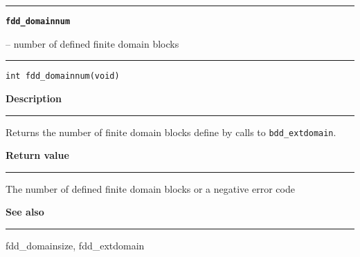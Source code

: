 \begin{minipage}{\textwidth}

\noindent\begin{minipage}{\textwidth}
\rule{\textwidth}{0.5mm}
{\tt\bf fdd\_domainnum }
\--- number of defined finite domain blocks  \hspace{\fill}
\\\rule[1.5ex]{\textwidth}{0.5mm}
\end{minipage}

\noindent\begin{verbatim}
int fdd_domainnum(void) 
\end{verbatim}

\vspace{\parsep}\noindent
{\bf Description}\\\rule[1.5ex]{\textwidth}{0.2mm}\vspace{-1.5ex}\setlength{\parindent}{1em}
Returns the number of finite domain blocks define by calls to
           {\tt bdd\_extdomain}. 

\setlength{\parindent}{0em}\vspace{\parsep}\vspace{\baselineskip}\noindent
{\bf Return value}\\\rule[1.5ex]{\textwidth}{0.2mm}\vspace{-1.5ex}
The number of defined finite domain blocks
           or a negative error code 

\vspace{\parsep}\vspace{\baselineskip}\noindent
{\bf See also}\\\rule[1.5ex]{\textwidth}{0.2mm}\vspace{-1.5ex}
fdd\_domainsize, fdd\_extdomain 
\end{minipage}
\vspace{8ex}
